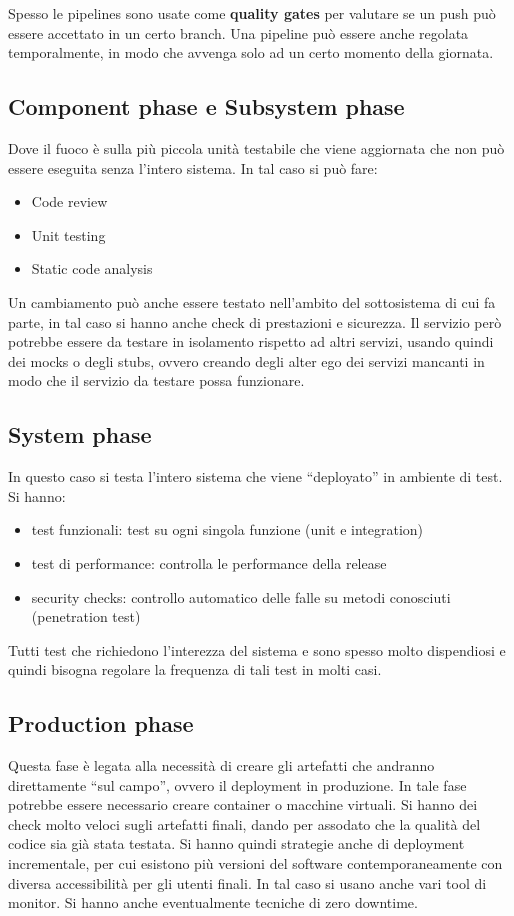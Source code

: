 Spesso le pipelines sono usate come \textbf{quality gates} per valutare se un push
può essere accettato in un certo branch. Una pipeline può essere anche regolata
temporalmente, in modo che avvenga solo ad un certo momento della giornata.
\subsection{Component phase e Subsystem phase}
Dove il fuoco è sulla più piccola unità testabile che viene aggiornata che non
può essere eseguita senza l'intero sistema. In tal caso si può fare:
\begin{itemize}
      \item Code review
      \item Unit testing
      \item Static code analysis
\end{itemize}

Un cambiamento può anche essere testato nell'ambito del sottosistema di cui fa
parte, in tal caso si hanno anche check di prestazioni e sicurezza. Il servizio
però potrebbe essere da testare in isolamento rispetto ad altri servizi, usando quindi
dei mocks o degli stubs, ovvero creando degli alter ego dei servizi mancanti in
modo che il servizio da testare possa funzionare.
\subsection{System phase}
In questo caso si testa l'intero sistema che viene “deployato” in ambiente di test.
Si hanno:
\begin{itemize}
	\item test funzionali: test su ogni singola funzione (unit e integration)
	\item test di performance: controlla le performance della release 
	\item security checks: controllo automatico delle falle su metodi conosciuti
      (penetration test)
\end{itemize}

Tutti test che richiedono l'interezza del sistema e sono spesso molto dispendiosi e
quindi bisogna regolare la frequenza di tali test in molti casi.
\subsection{Production phase}
Questa fase è legata alla necessità di creare gli artefatti che andranno
direttamente “sul campo”, ovvero il deployment in produzione. In tale fase potrebbe
essere necessario creare container o macchine virtuali. Si hanno dei check molto
veloci sugli artefatti finali, dando per assodato che la qualità del codice sia già
stata testata. Si hanno quindi strategie anche di deployment incrementale, per
cui esistono più versioni del software contemporaneamente con diversa accessibilità
per gli utenti finali. In tal caso si usano anche vari tool di monitor. Si hanno
anche eventualmente tecniche di zero downtime.

